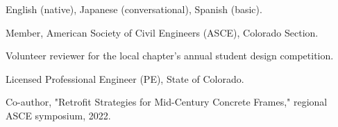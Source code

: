 \documentclass{LoLaTeXcv}
\begin{document}
\begin{lltxDescription}
	\item[Spoken] English (native), Japanese (conversational), Spanish (basic).
\end{lltxDescription}


\begin{lltxItemize}
	\item Member, American Society of Civil Engineers (ASCE), Colorado Section.
	\item Volunteer reviewer for the local chapter's annual student design competition.
\end{lltxItemize}

\begin{lltxItemize}
	\item Licensed Professional Engineer (PE), State of Colorado.
	\item Co-author, "Retrofit Strategies for Mid-Century Concrete Frames," regional ASCE symposium, 2022.
\end{lltxItemize}
\end{document}
